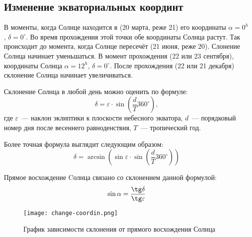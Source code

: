 \subsection{Изменение экваториальных координт}
В моменты, когда Солнце находится в  (20 марта, реже 21) его координаты $\alpha=0^h$, $\delta=0^{\circ}$. Во время прохождения этой точки обе координаты Солнца растут. Так происходит до момента, когда Солнце пересечёт  (21 июня, реже 20). Слонение Солнца начинает уменьшаться. В момент прохождения  (22 или 23 сентября), координаты Солнца $\alpha=12^h$, $\delta=0^{\circ}$. После прохождения  (22 или 21 декабря) склонение Солнца начинает увеличиваться.

Склонение Солнца в любой день можно оценить по формуле:
\begin{equation}
\delta=\varepsilon\cdot\sin \left(\frac{d}{T}360^{\circ}\right),
\end{equation}
где $\varepsilon$~--- наклон эклиптики к плоскости небесного экватора, $d$~--- порядковый номер дня после весеннего равноденствия, $T$~--- тропический год.

Более точная формула выглядит следующим образом:
\begin{equation}
\delta=\arcsin\left(\sin\varepsilon\cdot\sin \left(\frac{d}{T}360^{\circ}\right)\right)
\end{equation}

Прямое восхождение Cолнца связано со склонением данной формулой:
\begin{equation}
\sin\alpha=\frac{\tg\delta}{\tg\varepsilon}
\end{equation}

\centering
 \begin{figure}[!h]
  \centering
  \texttt{[image: change-coordin.png]}
  \caption{График зависимости склонения от прямого восхождения Солнца}
 \end{figure}